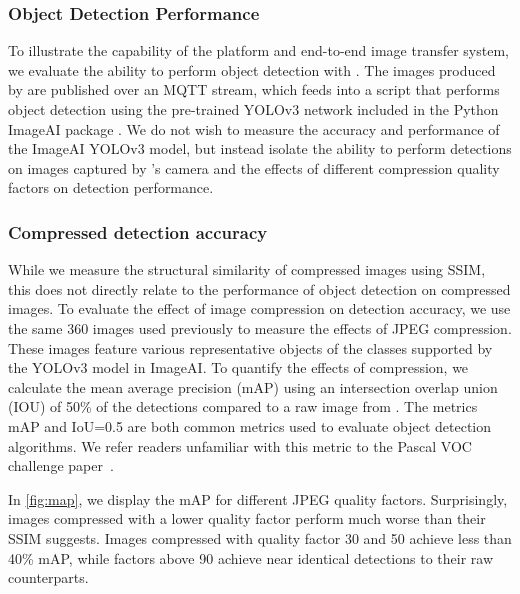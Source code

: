 
\subsubsection{Object Detection Performance}
To illustrate the capability of the platform and end-to-end image transfer system, we evaluate the ability to perform object detection with \name. The images produced by \name are published over an MQTT stream, which feeds into a script that performs object detection using the pre-trained YOLOv3 network included in the Python ImageAI package \cite{ImageAI}. We do not wish to measure the accuracy and performance of the ImageAI YOLOv3 model, but instead isolate the ability to perform detections on images captured by \name's camera and the effects of different compression quality factors on detection performance.


\subsubsection{Compressed detection accuracy}
While we measure the structural similarity of compressed images using SSIM, this does not directly relate to the performance of object detection on compressed images. To evaluate the effect of image compression on detection accuracy, we use the same 360 images used previously to measure the effects of JPEG compression. These images feature various representative objects of the classes supported by the YOLOv3 model in ImageAI. To quantify the effects of compression, we calculate the mean average precision (mAP) using an intersection overlap union (IOU) of 50\% of the detections compared to a raw image from \name. 
The metrics mAP and IoU=0.5 are both common metrics used to evaluate object detection algorithms. We refer readers unfamiliar with this metric to the Pascal VOC challenge paper~\cite{everingham2010pascal}.

In \cref{fig:map}, we display the mAP for different JPEG quality factors. Surprisingly, images compressed with a lower quality factor perform much worse than their SSIM suggests. Images compressed with quality factor 30 and 50 achieve less than 40\% mAP, while factors above 90 achieve near identical detections to their raw counterparts.

